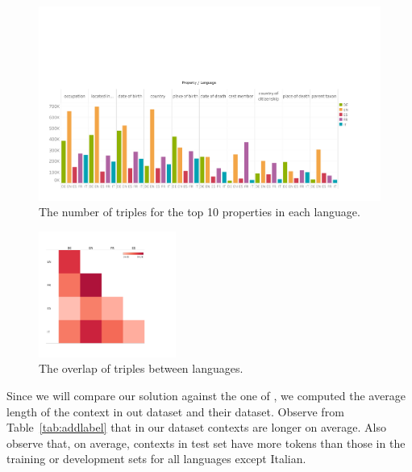 \begin{figure}[h!]%
\centering
\includegraphics[width=\textwidth]{images/count_examples-property_per_language_wide.pdf}
\caption{The number of triples for the top 10 properties in each language.}
\label{fig:top_10}
\end{figure}


\begin{figure}[h!]
\centering
\includegraphics[width=0.4\textwidth]{images/intersection_percentage_all.pdf}
\caption{The overlap of triples between languages.}
\label{fig:intersection_heatmap}
\end{figure}

Since we will compare our solution against the one of \cite{levy2017zero}, we computed the average length of the context in out dataset and their dataset. Observe from Table~\ref{tab:addlabel} that in our dataset contexts are longer on average. Also observe that, on average, contexts in test set have more tokens than those in the training or development sets for all languages except Italian.

